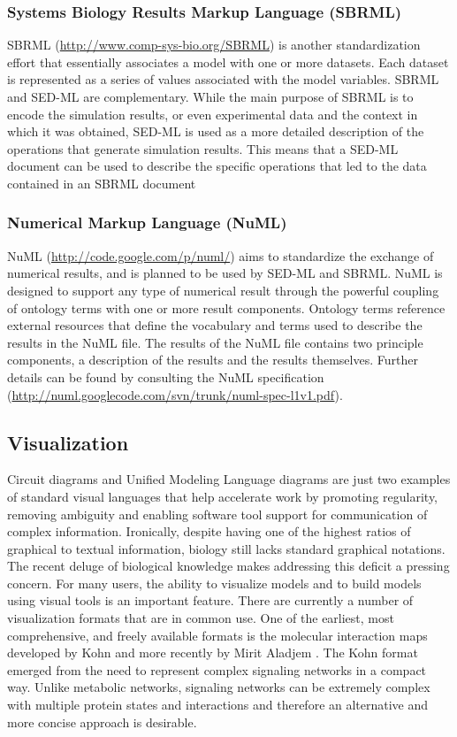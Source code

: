 \documentclass[]{article}
\begin{document}
\subsubsection{Systems Biology Results Markup Language (SBRML)}

SBRML (\url{http://www.comp-sys-bio.org/SBRML}) \autocite{dada2010sbrml}
is another standardization effort that essentially associates a model
with one or more datasets. Each dataset is represented as a series of
values associated with the model variables. SBRML and SED-ML are
complementary. While the main purpose of SBRML is to encode the
simulation results, or even experimental data and the context in which
it was obtained, SED-ML is used as a more detailed description of the
operations that generate simulation results. This means that a SED-ML
document can be used to describe the specific operations that led to the
data contained in an SBRML document

\subsubsection{Numerical Markup Language (NuML)}

NuML (\url{http://code.google.com/p/numl/}) aims to standardize the
exchange of numerical results, and is planned to be used by SED-ML and
SBRML. NuML is designed to support any type of numerical result through
the powerful coupling of ontology terms with one or more result
components. Ontology terms reference external resources that define the
vocabulary and terms used to describe the results in the NuML file. The
results of the NuML file contains two principle components, a
description of the results and the results themselves. Further details
can be found by consulting the NuML specification
(\url{http://numl.googlecode.com/svn/trunk/numl-spec-l1v1.pdf}).

\subsection{Visualization}

Circuit diagrams and Unified Modeling Language diagrams are just two
examples of standard visual languages that help accelerate work by
promoting regularity, removing ambiguity and enabling software tool
support for communication of complex information. Ironically, despite
having one of the highest ratios of graphical to textual information,
biology still lacks standard graphical notations. The recent deluge of
biological knowledge makes addressing this deficit a pressing concern.
For many users, the ability to visualize models and to build models
using visual tools is an important feature. There are currently a number
of visualization formats that are in common use. One of the earliest,
most comprehensive, and freely available formats is the molecular
interaction maps developed by Kohn \autocite{Kohn1999} and more recently
by Mirit Aladjem \autocite{Kohn2004}. The Kohn format emerged from the
need to represent complex signaling networks in a compact way. Unlike
metabolic networks, signaling networks can be extremely complex with
multiple protein states and interactions and therefore an alternative
and more concise approach is desirable.
\end{document}
